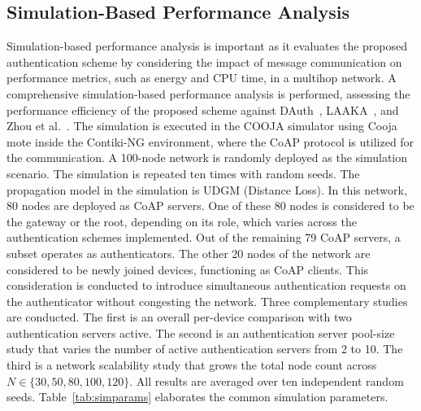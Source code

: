 \documentclass[conference]{IEEEtran}
\begin{document}
\subsection{Simulation-Based Performance Analysis}
\label{sec:sim}

Simulation-based performance analysis is important as it evaluates the proposed
authentication scheme by considering the impact of message communication on performance
metrics, such as energy and CPU time, in a multihop network. A comprehensive
simulation-based performance analysis is performed, assessing the performance efficiency
of the proposed scheme against DAuth~\cite{das2026comsnets}, LAAKA~\cite{ali2024laaka},
and Zhou et al.~\cite{zhou2024auth}. The simulation is executed in the COOJA simulator
using Cooja mote inside the Contiki-NG environment, where the CoAP protocol is utilized
for the communication. A 100-node network is randomly deployed as the simulation
scenario. The simulation is repeated ten times with random seeds. The propagation model in the simulation
is UDGM (Distance Loss). In this network, 80 nodes are deployed as CoAP servers. One of
these 80 nodes is considered to be the gateway or the root, depending on its role, which
varies across the authentication schemes implemented. Out of the remaining 79 CoAP
servers, a subset operates as authenticators. The other 20 nodes of the network are
considered to be newly joined devices, functioning as CoAP clients. This consideration
is conducted to introduce simultaneous authentication requests on the authenticator
without congesting the network. Three complementary studies are conducted. The first is
an overall per-device comparison with two authentication servers active. The second is an
authentication server pool-size study that varies the number of active authentication
servers from 2 to 10. The third is a network scalability study that grows the total node
count across $N \in \{30, 50, 80, 100, 120\}$. All results are averaged over ten
independent random seeds. Table~\ref{tab:simparams} elaborates the common simulation
parameters.
\end{document}
